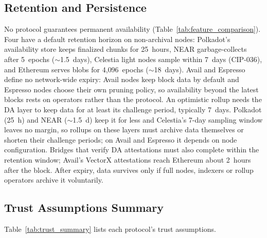 \subsection{Retention and Persistence}
\label{sec:security-retention}

No protocol guarantees permanent availability (Table~\ref{tab:feature_comparison}). Four have a default retention horizon on non-archival nodes: Polkadot's availability store keeps finalized chunks for 25~hours, NEAR garbage-collects after 5~epochs ($\sim$1.5~days), Celestia light nodes sample within 7~days (CIP-036), and Ethereum serves blobs for 4{,}096~epochs ($\sim$18~days). Avail and Espresso define no network-wide expiry: Avail nodes keep block data by default and Espresso nodes choose their own pruning policy, so availability beyond the latest blocks rests on operators rather than the protocol.
An optimistic rollup needs the DA layer to keep data for at least its challenge period, typically 7~days.
Polkadot (25~h) and NEAR ($\sim$1.5~d) keep it for less and Celestia's 7-day sampling window leaves no margin, so rollups on these layers must archive data themselves or shorten their challenge periods; on Avail and Espresso it depends on node configuration.
Bridges that verify DA attestations must also complete within the retention window; Avail's VectorX attestations reach Ethereum about 2~hours after the block.
After expiry, data survives only if full nodes, indexers or rollup operators archive it voluntarily.

\subsection{Trust Assumptions Summary}
\label{sec:security-trust}

Table~\ref{tab:trust_summary} lists each protocol's trust assumptions.


